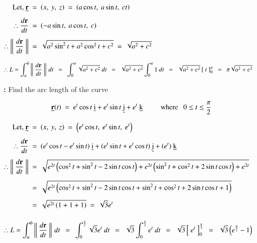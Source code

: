 \documentclass[12pt]{article}
\renewcommand{\vec}[1]{\underline{\mathrm{#1}}}
\renewcommand{\r}{\mathrm{\textbf{r}}}
\newcommand{\vf}[2][t]{\vec{#2}(#1)}
\newcommand{\norm}[1]{\left\lVert\ #1\ \right\rVert}
\begin{document}
\vspace{-\baselineskip}
\vspace{1ex}
$\begin{aligned}
   \text{Let,\ } \vec{\r} \ & = \ \vecbf \ = \ \vecbf[a\cos{t}][a\sin{t}][ct]\\[1ex]
   \therefore \frac{d\r}{dt} \ & = \ \vecbf[-a\sin{t}][a\cos{t}][c]\\[1ex]
   \therefore \norm{\frac{d\r}{dt}} \ & = \ \sqrt{a^2 \sin ^2 t+a^2 \cos ^2 t+c^2} \ = \ \sqrt{a^2+c^2}
\end{aligned}$

\vspace{3ex}
$\begin{aligned}
   \therefore L & = \int_{a}^{b} \norm{\frac{d\r}{dt}} \,dt
   \wspace \int_{0}^{\pi} \sqrt{a^2+c^2}\ dt
   \wspace \sqrt{a^2+c^2}\int_{0}^{\pi} 1\ dt
   \wspace \sqrt{a^2+c^2} \left[\ t\ \right]_{0}^{\pi}
   \wspace \pi\sqrt{a^2+c^2}
\end{aligned}$

\vspace{20ex}
\textbf{:} Find the arc length of the curve

\vspace{-\baselineskip}
$$\vf{\r} \ = \ \vecf[e^t\cos{t}][e^t\sin{t}][e^t] \tabs \quad \text{where} \tab 0 \leq t \leq \frac{\pi}{2}$$

\vspace{-\baselineskip}
\vspace{1ex}
$\begin{aligned}
   \text{Let,\ } \vec{\r} \ & = \ \vecbf \ = \ \vecbf[e^t\cos{t}][e^t\sin{t}][e^t]\\[1ex]
   \therefore \frac{d\r}{dt} \ & = \ \vecf[(e^t\cos{t}-e^t\sin{t})][(e^t\sin{t}+e^t\cos{t})][(e^t)]\\[1ex]
   \therefore \norm{\frac{d\r}{dt}} \ & = \ \sqrt{e^{2t}\left(\cos^2{t}+\sin^2{t}-2\sin{t}\cos{t}\right) + e^{2t}\left(\sin^2{t}+\cos^2{t}+2\sin{t}\cos{t}\right) + e^{2t}}\\[1ex]
   & = \ \sqrt{e^{2t}\left(\cos^2{t}+\sin^2{t}-2\sin{t}\cos{t} + \sin^2{t}+\cos^2{t}+2\sin{t}\cos{t} + 1\right)}\\[1ex]
   & = \ \sqrt{e^{2t}\left(1 + 1 + 1\right)} \ = \ \sqrt{3}e^t\\[1ex]
\end{aligned}$

\vspace{3ex}
$\begin{aligned}
   \therefore L & = \int_{a}^{b} \norm{\frac{d\r}{dt}} \,dt
   \wspace \int_{0}^{\frac{\pi}{2}} \sqrt{3}e^t\ dt
   \wspace \sqrt{3}\int_{0}^{\frac{\pi}{2}} e^t\ dt
   \wspace \sqrt{3} \left[\ e^t\ \right]_{0}^{\frac{\pi}{2}}
   \wspace \sqrt{3} \left(e^{\frac{\pi}{2}}-1\right)
\end{aligned}$
\end{document}

